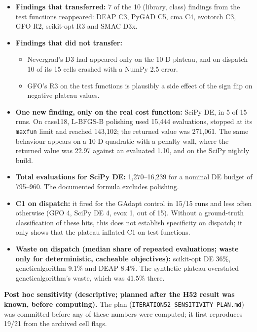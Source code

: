 \documentclass[acmsmall,screen,review,anonymous=false]{acmart}
\providecommand{\tightlist}{\setlength{\itemsep}{0pt}\setlength{\parskip}{0pt}}
\begin{document}
\begin{itemize}
\tightlist
\item
  \textbf{Findings that transferred:} 7 of the 10 (library, class) findings from the test functions reappeared: DEAP C3,
  PyGAD C5, cma C4, evotorch C3, GFO R2, scikit-opt R3 and SMAC D3x.
\item
  \textbf{Findings that did not transfer:}

  \begin{itemize}
  \tightlist
  \item
    Nevergrad's D3 had appeared only on the 10-D plateau, and on dispatch 10 of its 15 cells crashed with a NumPy 2.5
    error.
  \item
    GFO's R3 on the test functions is plausibly a side effect of the sign flip on negative plateau values.
  \end{itemize}
\item
  \textbf{One new finding, only on the real cost function:} SciPy DE, in 5 of 15 runs. On case118, L-BFGS-B polishing
  used 15,444 evaluations, stopped at its \texttt{maxfun} limit and reached 143,102; the returned value was 271,061. The same
  behaviour appears on a 10-D quadratic with a penalty wall, where the returned value was 22.97 against an evaluated
  1.10, and on the SciPy nightly build.
\item
  \textbf{Total evaluations for SciPy DE:} 1,270--16,239 for a nominal DE budget of 795--960. The documented formula excludes
  polishing.
\item
  \textbf{C1 on dispatch:} it fired for the GAdapt control in 15/15 runs and less often otherwise (GFO 4, SciPy DE 4,
  evox 1, out of 15). Without a ground-truth classification of these hits, this does not establish specificity on
  dispatch; it only shows that the plateau inflated C1 on test functions.
\item
  \textbf{Waste on dispatch (median share of repeated evaluations; waste only for deterministic, cacheable objectives):} scikit-opt DE 36\%, geneticalgorithm 9.1\% and DEAP
  8.4\%. The synthetic plateau overstated geneticalgorithm's waste, which was 41.5\% there.
\end{itemize}

\textbf{Post hoc sensitivity (descriptive; planned after the H52 result was known, before computing).} The plan
(\texttt{ITERATION52\_\allowbreak{}SENSITIVITY\_\allowbreak{}PLAN.\allowbreak{}md}) was committed before any of these numbers were computed; it first reproduces
19/21 from the archived cell flags.
\end{document}
